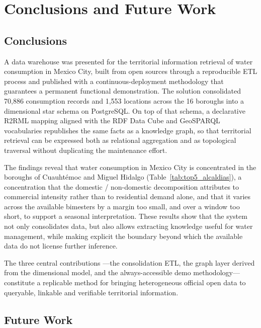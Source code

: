 \documentclass[runningheads]{llncs}
\renewcommand{\_}{\origunderscore\allowbreak}
\newif\ifshowchanges
\newcommand{\new}[1]{\ifshowchanges\textcolor{chg}{#1}\else#1\fi}
\begin{document}
\section{Conclusions and Future Work}
\label{sec:con}

\subsection{Conclusions}

A data warehouse was presented for the territorial information retrieval of water
consumption in Mexico City, built from open sources through a reproducible ETL
process and published with a continuous-deployment methodology that guarantees a
permanent functional demonstration. The solution consolidated 70,886 consumption
records and 1,553 locations across the 16 boroughs into a dimensional star schema
on PostgreSQL. \new{On top of that schema, a declarative R2RML mapping aligned
with the RDF Data Cube and GeoSPARQL vocabularies republishes the same facts as a
knowledge graph, so that territorial retrieval can be expressed both as
relational aggregation and as topological traversal without duplicating the
maintenance effort.}

The findings reveal that water consumption in Mexico City is concentrated in the
boroughs of Cuauht\'emoc and Miguel Hidalgo (Table~\ref{tab:top5_alcaldias}), a
concentration that the domestic / non-domestic decomposition attributes to
commercial intensity rather than to residential demand alone, and that it varies
across the available bimesters by a margin too small, and over a window too
short, to support a seasonal interpretation. These results show that the system
not only consolidates data, but also allows extracting knowledge useful for water
management, while making explicit the boundary beyond which the available data do
not license further inference.

\new{The three central contributions ---the consolidation ETL, the graph layer
derived from the dimensional model, and the always-accessible demo
methodology--- constitute a replicable method for bringing heterogeneous official
open data to queryable, linkable and verifiable territorial information.}

\subsection{Future Work}
\end{document}
